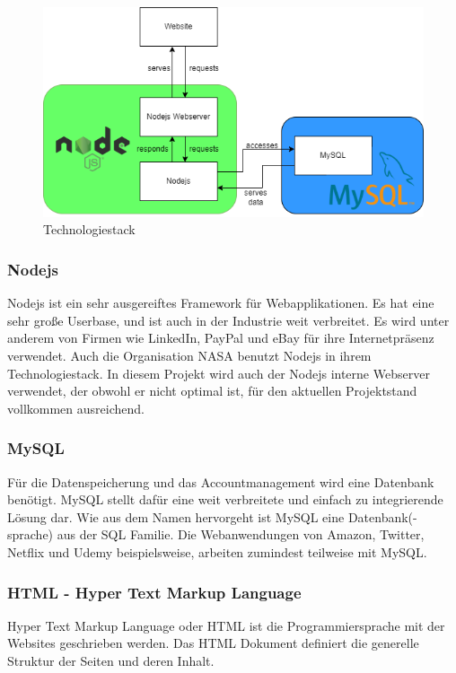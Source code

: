 \begin{figure}
	\centering
	\includegraphics[width=15cm]{images/TechnologyStack.png}
	\caption[Technologiestack]{Technologiestack}
	\label{fig:Technologiestack}
\end{figure}

\subsubsection{Nodejs}
Nodejs ist ein sehr ausgereiftes Framework für Webapplikationen. Es hat eine sehr große Userbase, und ist auch in der Industrie weit verbreitet. Es wird unter anderem von Firmen wie LinkedIn, PayPal und eBay für ihre Internetpräsenz verwendet. Auch die Organisation NASA benutzt Nodejs in ihrem Technologiestack.\cite{nodejs} \newline
In diesem Projekt wird auch der Nodejs interne Webserver verwendet, der obwohl er nicht optimal ist, für den aktuellen Projektstand vollkommen ausreichend.


\subsubsection{MySQL}
Für die Datenspeicherung und das Accountmanagement wird eine Datenbank benötigt. MySQL stellt dafür eine weit verbreitete und einfach zu integrierende Lösung dar. Wie aus dem  Namen hervorgeht ist MySQL eine Datenbank(-sprache) aus der SQL Familie. Die Webanwendungen von Amazon, Twitter, Netflix und Udemy beispielsweise, arbeiten zumindest teilweise mit MySQL. \cite{mysql}

\subsubsection{HTML - Hyper Text Markup Language}
Hyper Text Markup Language oder HTML ist die Programmiersprache mit der Websites geschrieben werden. Das HTML Dokument definiert die generelle Struktur der Seiten und deren Inhalt.

